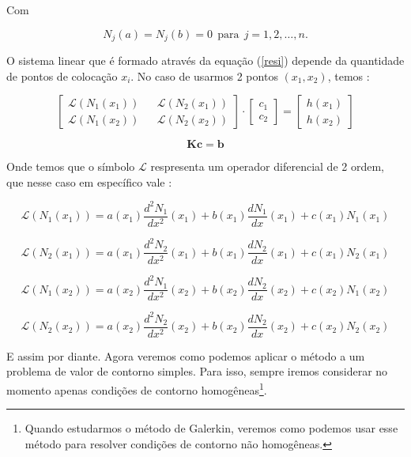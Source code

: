 \documentclass[a4paper, 12pt]{article}
\numberwithin{equation}{section}
\begin{document}
Com 

\begin{equation}
    N_j(a) = N_j(b) = 0 \ \ \textrm{para} \ \ j=1,2,\ldots,n.
\end{equation}

O sistema linear que é formado através da equação (\ref{resi}) depende da quantidade de pontos de colocação $x_i$. No caso de usarmos 2 pontos $(x_1,x_2)$, temos : 

\begin{equation}
    \begin{bmatrix}
    \mathcal{L}(N_1(x_1)) && \mathcal{L}(N_2(x_1)) \\ 
    \mathcal{L}(N_1(x_2)) && \mathcal{L}(N_2(x_2)) 
    \end{bmatrix}
    \cdot 
    \begin{bmatrix}
        c_1 \\
        c_2 
    \end{bmatrix}
    = 
    \begin{bmatrix}
        h(x_1) \\ 
        h(x_2)
    \end{bmatrix}
\end{equation}

\begin{equation}
    \mathbf{K}\mathbf{c} = \mathbf{b}
\end{equation}

Onde temos que o símbolo $\mathcal{L}$ respresenta um operador diferencial de 2 ordem, que nesse caso em específico vale : 

$$\mathcal{L}(N_1(x_1)) = a(x_1) \dfrac{d^2N_1}{dx^2}(x_1) + b(x_1)\dfrac{dN_1}{dx}(x_1) + c(x_1)N_1(x_1) $$

$$\mathcal{L}(N_2(x_1)) = a(x_1) \dfrac{d^2N_2}{dx^2}(x_1) + b(x_1)\dfrac{dN_2}{dx}(x_1) + c(x_1)N_2(x_1) $$

$$\mathcal{L}(N_1(x_2)) = a(x_2) \dfrac{d^2N_1}{dx^2}(x_2) + b(x_2)\dfrac{dN_2}{dx}(x_2) + c(x_2)N_1(x_2) $$

$$\mathcal{L}(N_2(x_2)) = a(x_2) \dfrac{d^2N_2}{dx^2}(x_2) + b(x_2)\dfrac{dN_2}{dx}(x_2) + c(x_2)N_2(x_2) $$

E assim por diante. Agora veremos como podemos aplicar o método a um problema de valor de contorno simples. Para isso, sempre iremos considerar no momento apenas condições de contorno homogêneas\footnote{Quando estudarmos o método de Galerkin, veremos como podemos usar esse método para resolver condições de contorno não homogêneas.}.
\end{document}

